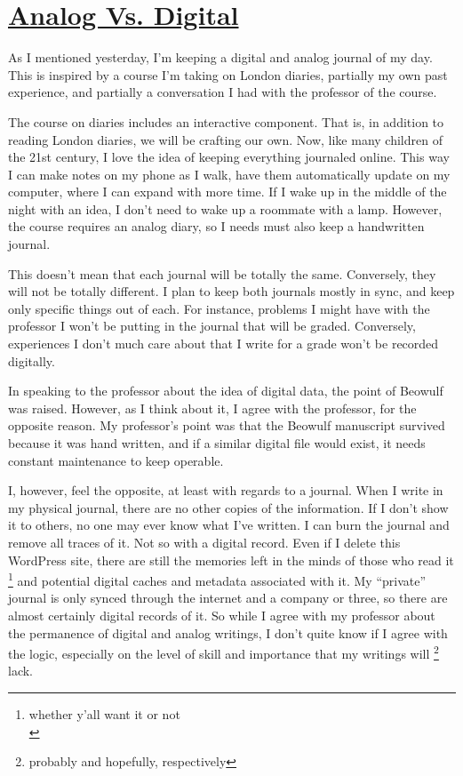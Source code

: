 \hypertarget{analog-vs-digital}{%
\section{\href{analog-vs-digital.html}{Analog Vs. Digital}}\label{analog-vs.-digital}}

As I mentioned yesterday,
I'm keeping a digital and analog journal of my day. This is inspired by
a course I'm taking on London diaries, partially my own past experience,
and partially a conversation I had with the professor of the course.

The course on diaries includes an interactive component. That is, in
addition to reading London diaries, we will be crafting our own. Now,
like many children of the 21st century, I love the idea of keeping
everything journaled online. This way I can make notes on my phone as I
walk, have them automatically update on my computer, where I can expand
with more time. If I wake up in the middle of the night with an idea, I
don't need to wake up a roommate with a lamp. However, the course
requires an analog diary, so I needs must also keep a handwritten
journal.

This doesn't mean that each journal will be totally the same.
Conversely, they will not be totally different. I plan to keep both
journals mostly in sync, and keep only specific things out of each. For
instance, problems I might have with the professor I won't be putting in
the journal that will be graded. Conversely, experiences I don't much
care about that I write for a grade won't be recorded digitally.

In speaking to the professor about the idea of digital data, the point
of Beowulf was raised. However, as I think about it, I agree with the
professor, for the opposite reason. My professor's point was that the
Beowulf manuscript survived because it was hand written, and if a
similar digital file would exist, it needs constant maintenance to keep
operable.

I, however, feel the opposite, at least with regards to a journal. When
I write in my physical journal, there are no other copies of the
information. If I don't show it to others, no one may ever know what
I've written. I can burn the journal and remove all traces of it. Not so
with a digital record. Even if I delete this WordPress site, there are
still the memories left in the minds of those who read it \footnote{whether
  y'all want it or not\\} and potential digital caches and metadata
associated with it. My ``private'' journal is only synced through the
internet and a company or three, so there are almost certainly digital
records of it. So while I agree with my professor about the permanence
of digital and analog writings, I don't quite know if I agree with the
logic, especially on the level of skill and importance that my writings
will \footnote{probably and hopefully, respectively} lack.
